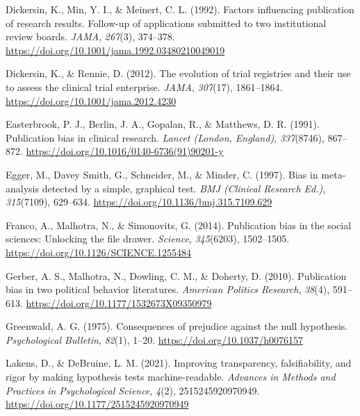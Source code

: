 \documentclass[
  ,jou, a4paper,floatsintext]{apa6}
\newlength{\cslhangindent}
\newlength{\cslentryspacingunit} %
\newenvironment{CSLReferences}[2] %
 {%
  \setlength{\parindent}{0pt}
  \ifodd #1
  \let\oldpar\par
  \def\par{\hangindent=\cslhangindent\oldpar}
  \fi
  \setlength{\parskip}{#2\cslentryspacingunit}
 }%
 {}
\begin{document}
\begin{CSLReferences}{1}{0}
\leavevmode{}%
Dickersin, K., Min, Y. I., \& Meinert, C. L. (1992). Factors influencing publication of research results. {Follow-up} of applications submitted to two institutional review boards. \emph{JAMA}, \emph{267}(3), 374--378. \url{https://doi.org/10.1001/jama.1992.03480210049019}

\leavevmode{}%
Dickersin, K., \& Rennie, D. (2012). The evolution of trial registries and their use to assess the clinical trial enterprise. \emph{JAMA}, \emph{307}(17), 1861--1864. \url{https://doi.org/10.1001/jama.2012.4230}

\leavevmode{}%
Easterbrook, P. J., Berlin, J. A., Gopalan, R., \& Matthews, D. R. (1991). Publication bias in clinical research. \emph{Lancet (London, England)}, \emph{337}(8746), 867--872. \url{https://doi.org/10.1016/0140-6736(91)90201-y}

\leavevmode{}%
Egger, M., Davey Smith, G., Schneider, M., \& Minder, C. (1997). Bias in meta-analysis detected by a simple, graphical test. \emph{BMJ (Clinical Research Ed.)}, \emph{315}(7109), 629--634. \url{https://doi.org/10.1136/bmj.315.7109.629}

\leavevmode{}%
Franco, A., Malhotra, N., \& Simonovits, G. (2014). Publication bias in the social sciences: {Unlocking} the file drawer. \emph{Science}, \emph{345}(6203), 1502--1505. \url{https://doi.org/10.1126/SCIENCE.1255484}

\leavevmode{}%
Gerber, A. S., Malhotra, N., Dowling, C. M., \& Doherty, D. (2010). Publication bias in two political behavior literatures. \emph{American Politics Research}, \emph{38}(4), 591--613. \url{https://doi.org/10.1177/1532673X09350979}

\leavevmode{}%
Greenwald, A. G. (1975). Consequences of prejudice against the null hypothesis. \emph{Psychological Bulletin}, \emph{82}(1), 1--20. \url{https://doi.org/10.1037/h0076157}

\leavevmode{}%
Lakens, D., \& DeBruine, L. M. (2021). Improving transparency, falsifiability, and rigor by making hypothesis tests machine-readable. \emph{Advances in Methods and Practices in Psychological Science}, \emph{4}(2), 2515245920970949. \url{https://doi.org/10.1177/2515245920970949}


\end{CSLReferences}
\end{document}

